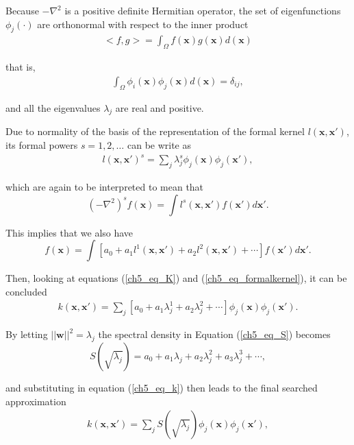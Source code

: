 \documentclass[onecolumn,a4paper,11pt]{article}
\begin{document}
\noindent Because $-\nabla^2$ is a positive definite Hermitian operator, the set of eigenfunctions $\phi_j(\cdot)$ are orthonormal with respect to the inner product
%
\begin{eqnarray*}
<f,g>=\int_\Omega f(\bm{x}) g(\bm{x}) d(\bm{x})
\end{eqnarray*} 

\noindent that is,
%
\begin{eqnarray*}
\int_\Omega \phi_i(\bm{x}) \phi_j(\bm{x}) d(\bm{x}) = \delta_{ij},
\end{eqnarray*} 

\noindent and all the eigenvalues $\lambda_j$ are real and positive. 

Due to normality of the basis of the representation of the formal kernel $l(\bm{x},\bm{x}')$, its formal powers $s=1,2,\dots$ can be write as
%
\begin{eqnarray}\label{ch5_eq_formalkernel}
l(\bm{x},\bm{x}')^s= \sum_j \lambda_j^s \phi_j(\bm{x}) \phi_j(\bm{x}'),
\end{eqnarray} 

\noindent which are again to be interpreted to mean that
%
\begin{equation*}
(-\nabla^2)^s f(\bm{x}) = \int l^s(\bm{x},\bm{x}') f(\bm{x}') d\bm{x}'.
\end{equation*} 

\noindent This implies that we also have
%
\begin{equation*}
[a_0+a_1(-\nabla^2)+a_2(-\nabla^2)^2+\cdots] f(\bm{x}) = \int [a_0+a_1l^1(\bm{x},\bm{x}')+a_2l^2(\bm{x},\bm{x}')+\cdots] f(\bm{x}') d\bm{x}'.
\end{equation*} 


Then, looking at equations (\ref{ch5_eq_K}) and (\ref{ch5_eq_formalkernel}), it can be concluded 
%
\begin{eqnarray}\label{ch5_eq_k}
k(\bm{x},\bm{x}')= \sum_j [a_0+a_1\lambda_j^1+a_2\lambda_j^2+\cdots] \phi_j(\bm{x}) \phi_j(\bm{x}').
\end{eqnarray} 

\noindent By letting $||\bm{w}||^2=\lambda_j$ the spectral density in Equation (\ref{ch5_eq_S}) becomes
%
\begin{equation*}
S(\sqrt{\lambda_j})=a_0+a_1\lambda_j+a_2\lambda_j^2+a_3\lambda_j^3+\cdots,
\end{equation*}

\noindent and substituting in equation (\ref{ch5_eq_k}) then leads to the final searched approximation
%
\begin{eqnarray}\label{ch5_eq_k_2}
k(\bm{x},\bm{x}')= \sum_j S(\sqrt{\lambda_j}) \phi_j(\bm{x}) \phi_j(\bm{x}'),
\end{eqnarray} 
\end{document}
